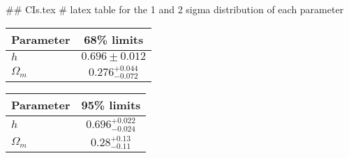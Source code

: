 ## CIs.tex
# latex table for the 1 and 2 sigma distribution of each parameter

\begin{tabular} { l  c}
 Parameter &  68\% limits\\
\hline
{\boldmath$h              $} & $0.696\pm 0.012            $\\
{\boldmath$\Omega_m       $} & $0.276^{+0.044}_{-0.072}   $\\
\hline
\end{tabular}

\begin{tabular} { l  c}
 Parameter &  95\% limits\\
\hline
{\boldmath$h              $} & $0.696^{+0.022}_{-0.024}   $\\
{\boldmath$\Omega_m       $} & $0.28^{+0.13}_{-0.11}      $\\
\hline
\end{tabular}
